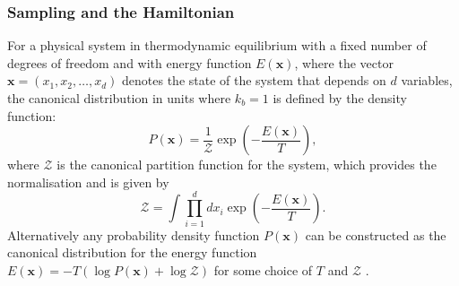 \documentclass[12pt]{article}
\begin{document}
        \subsubsection{Sampling and the Hamiltonian}
            \label{sec:SamplingAndTheHamiltonian}
            For a physical system in thermodynamic equilibrium with a fixed number of degrees of freedom and with energy function $E\left(\bm{x}\right)$, where the vector $\bm{x} = \left(x_{1},x_{2},\dots,x_{d}\right)$ denotes the state of the system that depends on $d$ variables, the canonical distribution in units where $k_b=1$ is defined by the density function:
            \begin{equation}
                \label{eq:BoltzmannDistribution}
                P\left(\bm{x}\right) = \frac{1}{\mathcal{Z}} \exp{\left(-\frac{E\left(\bm{x}\right)}{T} \right)},
            \end{equation}
            where $\mathcal{Z}$ is the canonical partition function for the system, which provides the normalisation and is given by 
            \begin{equation}
                \label{eq:JointPartitionFunction}
                \mathcal{Z} = \int\prod_{i=1}^{d}dx_{i} \exp{\left(-\frac{E\left(\bm{x}\right)}{T} \right)}.
            \end{equation}
            Alternatively any probability density function $P\left(\bm{x}\right)$ can be constructed as the canonical distribution for the energy function $ E\left(\bm{x}\right) = -T\left(\log{P\left(\bm{x}\right)} + \log{\mathcal{Z}}\right)$ for some choice of $T$ and $\mathcal{Z}$ \cite{neal_2011}. 
\end{document}
